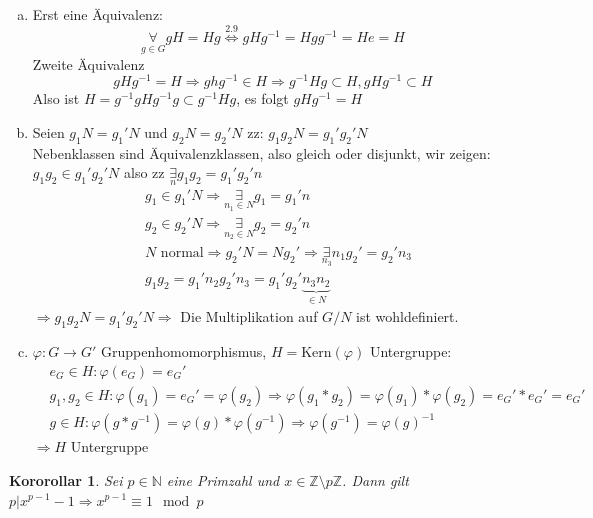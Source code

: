 \documentclass{article}
\newtheorem{korollar}[thm]{Kororollar}
\newcommand{\N}{\mathbb{N}}
\newcommand{\Z}{\mathbb{Z}}
\newcommand{\Kern}{\text{Kern}}
\begin{document}
\begin{enumerate}[(a)]
    \item Erst eine Äquivalenz:
        \begin{equation*}
            \underset{g\in G}\forall
            gH=Hg\overset{2.9}\Leftrightarrow gHg^{-1}=Hgg^{-1}
            =He=H
        \end{equation*}
        Zweite Äquivalenz
        \begin{equation*}
            gHg^{-1}=H\Rightarrow ghg^{-1}\in H
            \Rightarrow g^{-1}Hg\subset H,gHg^{-1}\subset H
        \end{equation*}
        Also ist $H=g^{-1}gHg^{-1}g\subset g^{-1}Hg$,
        es folgt $gHg^{-1}=H$
    \item
        Seien $g_1N=g_1'N$ und $g_2N=g_2'N$ zz: $g_1g_2N=
        g_1'g_2'N$\\
        Nebenklassen sind Äquivalenzklassen, also gleich
        oder disjunkt, wir zeigen:
        $g_1g_2\in g_1'g_2'N$ also zz $\underset{n}\exists
        g_1g_2=g_1'g_2'n$
        \begin{align*}
            &g_1\in g_1'N\Rightarrow\underset{n_1\in N}
            \exists g_1=g_1'n\\
            &g_2\in g_2'N\Rightarrow\underset{n_2\in N}
            \exists g_2=g_2'n\\
            &N\text{ normal}\Rightarrow g_2'N=Ng_2'
            \Rightarrow\underset{n_3}\exists n_1g_2'=
            g_2'n_3\\
            &g_1g_2=g_1'n_2g_2'n_3=g_1'g_2'
            \underbrace{n_3n_2}_{\in N}
        \end{align*}
        $\Rightarrow g_1g_2N=g_1'g_2'N\Rightarrow$ Die
        Multiplikation auf $G/N$ ist wohldefiniert.
    \item
        $\varphi:G\to G'$ Gruppenhomomorphismus,
        $H=\Kern(\varphi)$ Untergruppe:
        \begin{align*}
            &e_G\in H:\varphi(e_G)=e_G'\\
            &g_1,g_2\in H:\varphi(g_1)=e_G'=
            \varphi(g_2)\Rightarrow\varphi(g_1*g_2)=
            \varphi(g_1)*\varphi(g_2)=e_G'*e_G'=e_G'\\
            &g\in H:\varphi(g*g^{-1})=\varphi(g)*
            \varphi(g^{-1})\Rightarrow\varphi(g^{-1})
            =\varphi(g)^{-1}
        \end{align*}
        $\Rightarrow H$ Untergruppe
\end{enumerate}
\begin{korollar}
    Sei $p\in\N$ eine Primzahl und $x\in\Z\setminus p\Z$.
    Dann gilt $p|x^{p-1}-1\Rightarrow x^{p-1}\equiv 1\mod p$
\end{korollar}
\end{document}
